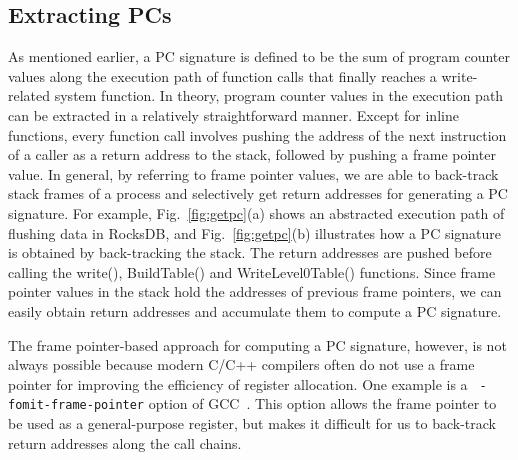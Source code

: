 \subsection{Extracting PCs}
As mentioned earlier, a PC signature is defined to be the sum of program counter
values along the execution path of function calls that finally reaches a
write-related system function.  
In theory, program counter values in the
execution path can be extracted in a relatively straightforward manner.  Except
for inline functions, every function call involves pushing the address of the
next instruction of a caller as a return address to the stack, followed by
pushing a frame pointer value.  In general, by referring to frame pointer
values, we are able to back-track stack frames of a process and selectively get
return addresses for generating a PC signature.  For example,
Fig.~\ref{fig:getpc}(a) shows an abstracted execution path of flushing data in
RocksDB, and Fig.~\ref{fig:getpc}(b) illustrates how a PC signature is obtained
by back-tracking the stack.  The return addresses are pushed before calling the
\textsf{\small  write()}, \textsf{\small  BuildTable()} and \textsf{\small
WriteLevel0Table()} functions.  Since frame pointer values in the stack hold
the addresses of previous frame pointers, we can easily obtain return addresses
and accumulate them to compute a PC signature.  

The frame pointer-based approach for computing a PC signature, however, is not
always possible because modern C/C++ compilers often do not use a frame pointer
for improving the efficiency of register allocation.  One example is a {\tt
-fomit-frame-pointer} option of GCC~\cite{GCC}.  This option allows the frame
pointer to be used as a general-purpose register, but makes it difficult for us
to back-track return addresses along the call chains.  

